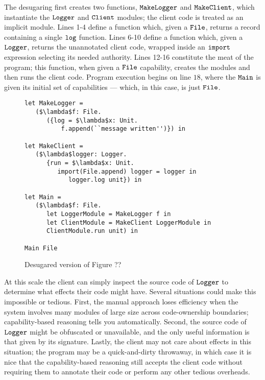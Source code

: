 The desugaring first creates two functions, $\mathtt{MakeLogger}$ and $\mathtt{MakeClient}$, which instantiate the $\mathtt{Logger}$ and $\mathtt{Client}$ modules; the client code is treated as an implicit module. Lines 1-4 define a function which, given a $\mathtt{File}$, returns a record containing a single $\mathtt{log}$ function. Lines 6-10 define a function which, given a $\mathtt{Logger}$, returns the unannotated client code, wrapped inside an $\mathtt{import}$ expression selecting its needed authority. Lines 12-16 constitute the meat of the program; this function, when given a $\mathtt{File}$ capability, creates the modules and then runs the client code. Program execution begins on line $18$, where the $\mathtt{Main}$ is given its initial set of capabilities --- which, in this case, is just $\mathtt{File}$.

\begin{figure}[h]

\begin{lstlisting}
let MakeLogger =
   ($\lambda$f: File.
      ({log = $\lambda$x: Unit.
          f.append(``message written'')}) in
          
let MakeClient =
   ($\lambda$logger: Logger.
      {run = $\lambda$x: Unit.
         import(File.append) logger = logger in
            logger.log unit}) in
         
let Main =
   ($\lambda$f: File.
      let LoggerModule = MakeLogger f in
      let ClientModule = MakeClient LoggerModule in
      ClientModule.run unit) in

Main File
\end{lstlisting}

\caption{Desugared version of Figure ??}
\label{This is the label.}
\end{figure}

At this scale the client can simply inspect the source code of $\mathtt{Logger}$ to determine what effects their code might have. Several situations could make this impossible or tedious. First, the manual approach loses efficiency when the system involves many modules of large size across code-ownership boundaries; capability-based reasoning tells you automatically. Second, the source code of $\mathtt{Logger}$ might be obfuscated or unavailable, and the only useful information is that given by its signature. Lastly, the client may not care about effects in this situation; the program may be a quick-and-dirty throwaway, in which case it is nice that the capability-based reasoning still accepts the client code without requiring them to annotate their code or perform any other tedious overheads.

